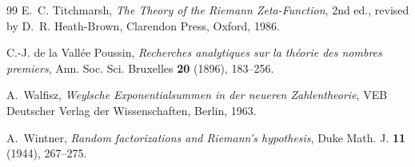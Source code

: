 \documentclass[11pt,reqno]{amsart}
\numberwithin{equation}{section}
\theoremstyle{plain}
\theoremstyle{definition}
\theoremstyle{remark}
\begin{document}
\begin{thebibliography}{99}
E.~C. Titchmarsh, \emph{The Theory of the Riemann Zeta-Function}, 2nd ed.,
revised by D.~R. Heath-Brown, Clarendon Press, Oxford, 1986.

C.-J. de la Vall\'ee Poussin, \emph{Recherches analytiques sur la th\'eorie
des nombres premiers}, Ann. Soc. Sci. Bruxelles \textbf{20} (1896), 183--256.

A.~Walfisz, \emph{Weylsche Exponentialsummen in der neueren Zahlentheorie},
VEB Deutscher Verlag der Wissenschaften, Berlin, 1963.

A.~Wintner, \emph{Random factorizations and Riemann's hypothesis}, Duke
Math. J. \textbf{11} (1944), 267--275.

\end{thebibliography}
\end{document}
